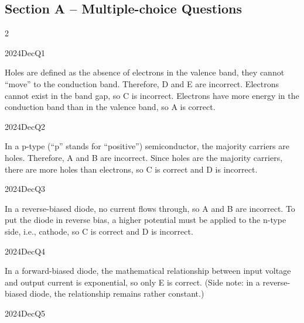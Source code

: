 
\subsection*{Section A -- Multiple-choice Questions}
\begin{multicols}{2}

\begin{qsolution}{2024}{Dec}{Q1}{\tgElectronics \tgElectronicsSemiconductor}

    Holes are defined as the absence of electrons in the valence band, they cannot ``move'' to the conduction band.
    Therefore, D and E are incorrect.
    Electrons cannot exist in the band gap, so C is incorrect.
    Electrons have more energy in the conduction band than in the valence band, so A is correct.
\end{qsolution}

\begin{qsolution}{2024}{Dec}{Q2}{\tgElectronics \tgElectronicsSemiconductor}

    In a p-type (``p'' stands for ``positive'') semiconductor, the majority carriers are holes.
    Therefore, A and B are incorrect.
    Since holes are the majority carriers, there are more holes than electrons, so C is correct and D is incorrect.
\end{qsolution}

\begin{qsolution}{2024}{Dec}{Q3}{\tgElectronics \tgElectronicsDiodes}

    In a reverse-biased diode, no current flows through, so A and B are incorrect.
    To put the diode in reverse bias, a higher potential must be applied to the n-type side, i.e., cathode, so C is correct and D is incorrect.
\end{qsolution}

\begin{qsolution}{2024}{Dec}{Q4}{\tgElectronics \tgElectronicsDiodes}

    In a forward-biased diode, the mathematical relationship between input voltage and output current is exponential, so only E is correct.
    (Side note: in a reverse-biased diode, the relationship remains rather constant.)
\end{qsolution}

\begin{qsolution}{2024}{Dec}{Q5}{\tgElectronics \tgElectronicsBJT}


\end{qsolution}
\end{multicols}
